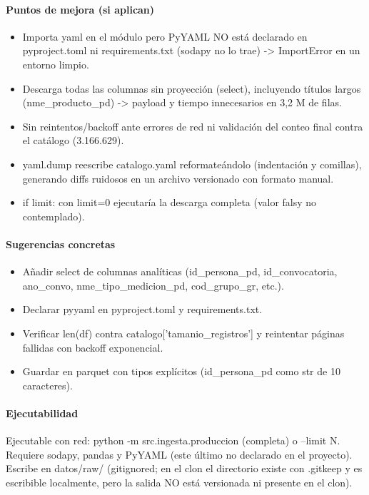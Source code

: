 \paragraph{Puntos de mejora (si aplican)}
\begin{itemize}
  \item Importa yaml en el módulo pero PyYAML NO está declarado en pyproject.toml ni requirements.txt (sodapy no lo trae) -> ImportError en un entorno limpio.
  \item Descarga todas las columnas sin proyección (select), incluyendo títulos largos (nme\_producto\_pd) -> payload y tiempo innecesarios en 3,2 M de filas.
  \item Sin reintentos/backoff ante errores de red ni validación del conteo final contra el catálogo (3.166.629).
  \item yaml.dump reescribe catalogo.yaml reformateándolo (indentación y comillas), generando diffs ruidosos en un archivo versionado con formato manual.
  \item if limit: con limit=0 ejecutaría la descarga completa (valor falsy no contemplado).
\end{itemize}

\paragraph{Sugerencias concretas}
\begin{itemize}
  \item Añadir select de columnas analíticas (id\_persona\_pd, id\_convocatoria, ano\_convo, nme\_tipo\_medicion\_pd, cod\_grupo\_gr, etc.).
  \item Declarar pyyaml en pyproject.toml y requirements.txt.
  \item Verificar len(df) contra catalogo['tamanio\_registros'] y reintentar páginas fallidas con backoff exponencial.
  \item Guardar en parquet con tipos explícitos (id\_persona\_pd como str de 10 caracteres).
\end{itemize}

\paragraph{Ejecutabilidad}
Ejecutable con red: python -m src.ingesta.produccion (completa) o --limit N. Requiere sodapy, pandas y PyYAML (este último no declarado en el proyecto). Escribe en datos/raw/ (gitignored; en el clon el directorio existe con .gitkeep y es escribible localmente, pero la salida NO está versionada ni presente en el clon).

